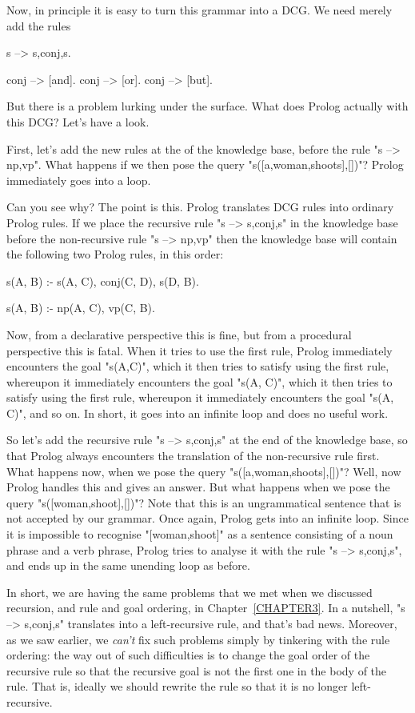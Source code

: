 Now, in principle it is easy to turn this grammar into a DCG. We
need merely add the rules
\begin{LPNcodedisplay}
s --> s,conj,s.

conj --> [and].
conj --> [or].
conj --> [but].
\end{LPNcodedisplay}
But there is a problem lurking under the surface. What does Prolog
actually  with this DCG? Let's have a look.

First, let's add the new rules at the  of the
knowledge base, before the rule "s --> np,vp". What happens if we then
pose the query "s([a,woman,shoots],[])"? Prolog immediately goes into
a loop.

Can you see why? The point is this. Prolog translates DCG rules into
ordinary Prolog rules. If we place the recursive rule
"s --> s,conj,s" in the knowledge base before the non-recursive
rule
"s --> np,vp" then the knowledge base will contain the following two
Prolog rules, in this order:
\begin{LPNcodedisplay}
s(A, B) :-
        s(A, C),
        conj(C, D),
        s(D, B).

s(A, B) :-
        np(A, C),
        vp(C, B).
\end{LPNcodedisplay}
Now, from a declarative perspective this is fine, but from a
procedural perspective this is fatal.  When it tries to use the first
rule, Prolog immediately encounters the goal "s(A,C)", which it then
tries to satisfy using the first rule, whereupon it immediately
encounters the goal "s(A, C)", which it then tries to satisfy using
the first rule, whereupon it immediately encounters the goal "s(A, C)",
and so on. In short, it goes into an infinite loop and does no
useful work.

So let's add the recursive rule "s --> s,conj,s" at the end of the
knowledge base, so that Prolog always encounters the translation of
the non-recursive rule first. What happens now, when we pose the query
"s([a,woman,shoots],[])"? Well, now Prolog handles this and gives an
answer. But what happens when we pose the query "s([woman,shoot],[])"?
Note that this is an ungrammatical sentence that is not accepted by
our grammar. Once again, Prolog gets into an infinite loop. Since it
is impossible to recognise "[woman,shoot]" as a sentence consisting of
a noun phrase and a verb phrase, Prolog tries to analyse it with the
rule "s --> s,conj,s", and ends up in the same unending loop as
before.

In short, we are having the same problems that we met when we
discussed recursion, and rule and goal ordering, in
Chapter~\ref{CHAPTER3}.  In a nutshell, "s --> s,conj,s" translates
into a left-recursive rule, and that's bad news.  Moreover, as we saw
earlier, we \textit{can't} fix such problems simply by tinkering with
the rule ordering: the way out of such difficulties is to change the
goal order of the recursive rule so that the recursive goal is not the
first one in the body of the rule. That is, ideally we should rewrite
the rule so that it is no longer left-recursive.

